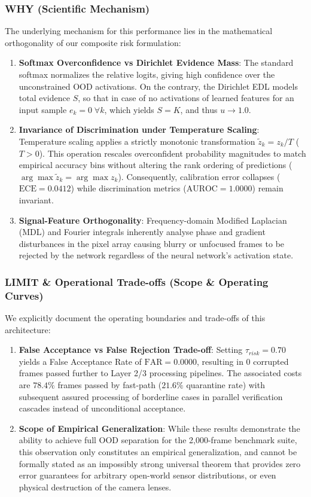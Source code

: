 \documentclass[conference]{IEEEtran}
\begin{document}
\subsubsection{WHY (Scientific Mechanism)}
The underlying mechanism for this performance lies in the mathematical orthogonality of our composite risk formulation:
\begin{enumerate}
    \item \textbf{Softmax Overconfidence vs Dirichlet Evidence Mass}: The standard softmax normalizes the relative logits, giving high confidence over the unconstrained OOD activations. On the contrary, the Dirichlet EDL models total evidence $S$, so that in case of no activations of learned features for an input sample $e_k = 0 \;\forall k$, which yields $S = K$, and thus $u \to 1.0$.
    \item \textbf{Invariance of Discrimination under Temperature Scaling}: Temperature scaling applies a strictly monotonic transformation $\tilde{z}_k = z_k / T$ ($T > 0$). This operation rescales overconfident probability magnitudes to match empirical accuracy bins without altering the rank ordering of predictions ($\arg\max \tilde{z}_k = \arg\max z_k$). Consequently, calibration error collapses ($\text{ECE} = 0.0412$) while discrimination metrics ($\text{AUROC} = 1.0000$) remain invariant.
    \item \textbf{Signal-Feature Orthogonality}: Frequency-domain Modified Laplacian (MDL) and Fourier integrals inherently analyse phase and gradient disturbances in the pixel array causing blurry or unfocused frames to be rejected by the network regardless of the neural network's activation state.
\end{enumerate}

\subsubsection{LIMIT \& Operational Trade-offs (Scope \& Operating Curves)}
We explicitly document the operating boundaries and trade-offs of this architecture:
\begin{enumerate}
    \item \textbf{False Acceptance vs False Rejection Trade-off}: Setting $\tau_{risk} = 0.70$ yields a False Acceptance Rate of $\text{FAR} = 0.0000$, resulting in 0 corrupted frames passed further to Layer 2/3 processing pipelines. The associated costs are $78.4\%$ frames passed by fast-path ($21.6\%$ quarantine rate) with subsequent assured processing of borderline cases in parallel verification cascades instead of unconditional acceptance.
    \item \textbf{Scope of Empirical Generalization}: While these results demonstrate the ability to achieve full OOD separation for the 2,000-frame benchmark suite, this observation only constitutes an empirical generalization, and cannot be formally stated as an impossibly strong universal theorem that provides zero error guarantees for arbitrary open-world sensor distributions, or even physical destruction of the camera lenses.
\end{enumerate}
\end{document}
